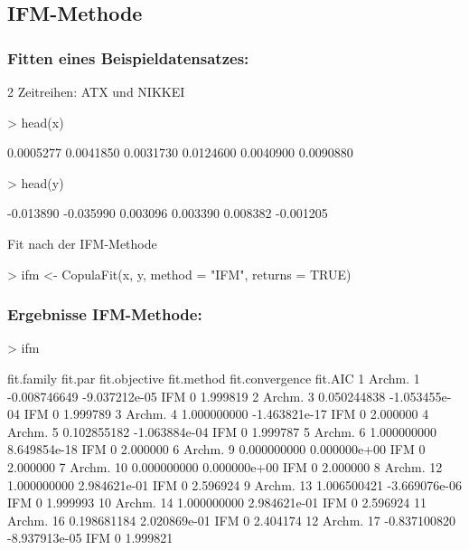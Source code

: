 \subsection{IFM-Methode}
\begin{frame}[containsverbatim]
  \frametitle{Fitten eines Beispieldatensatzes:}
  2 Zeitreihen: ATX und NIKKEI
\footnotesize{
\begin{Schunk}
\begin{Sinput}
> head(x)
\end{Sinput}
\begin{Soutput}
[1] 0.0005277 0.0041850 0.0031730 0.0124600 0.0040900 0.0090880
\end{Soutput}
\begin{Sinput}
> head(y)
\end{Sinput}
\begin{Soutput}
[1] -0.013890 -0.035990  0.003096  0.003390  0.008382 -0.001205
\end{Soutput}
\end{Schunk}
}

\normalsize{
Fit nach der IFM-Methode
}
\footnotesize{
\begin{Schunk}
\begin{Sinput}
> ifm <- CopulaFit(x, y, method = "IFM", returns = TRUE)
\end{Sinput}
\end{Schunk}
}
\end{frame}


\begin{frame}[containsverbatim]
  \frametitle{Ergebnisse IFM-Methode:}
\scriptsize{
\begin{Schunk}
\begin{Sinput}
> ifm
\end{Sinput}
\begin{Soutput}
   fit.family      fit.par fit.objective fit.method fit.convergence  fit.AIC
1    Archm. 1 -0.008746649 -9.037212e-05        IFM               0 1.999819
2    Archm. 3  0.050244838 -1.053455e-04        IFM               0 1.999789
3    Archm. 4  1.000000000 -1.463821e-17        IFM               0 2.000000
4    Archm. 5  0.102855182 -1.063884e-04        IFM               0 1.999787
5    Archm. 6  1.000000000  8.649854e-18        IFM               0 2.000000
6    Archm. 9  0.000000000  0.000000e+00        IFM               0 2.000000
7   Archm. 10  0.000000000  0.000000e+00        IFM               0 2.000000
8   Archm. 12  1.000000000  2.984621e-01        IFM               0 2.596924
9   Archm. 13  1.006500421 -3.669076e-06        IFM               0 1.999993
10  Archm. 14  1.000000000  2.984621e-01        IFM               0 2.596924
11  Archm. 16  0.198681184  2.020869e-01        IFM               0 2.404174
12  Archm. 17 -0.837100820 -8.937913e-05        IFM               0 1.999821
\end{Soutput}
\end{Schunk}
}
\end{frame}

